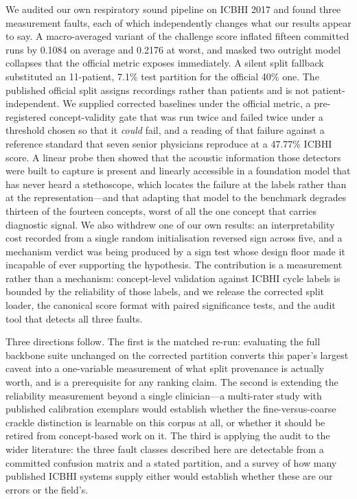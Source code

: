 \documentclass[journal,onecolumn]{IEEEtran}
\begin{document}
We audited our own respiratory sound pipeline on ICBHI 2017 and found three
measurement faults, each of which independently changes what our results appear to
say. A macro-averaged variant of the challenge score inflated fifteen committed runs
by 0.1084 on average and 0.2176 at worst, and masked two outright model collapses
that the official metric exposes immediately. A silent split fallback substituted an
11-patient, 7.1\% test partition for the official 40\% one. The published official
split assigns recordings rather than patients and is not patient-independent. We
supplied corrected baselines under the official metric, a pre-registered
concept-validity gate that was run twice and failed twice under a threshold chosen so
that it \emph{could} fail, and a reading of that failure against a reference standard
that seven senior physicians reproduce at a 47.77\% ICBHI score. A linear probe then
showed that the acoustic information those detectors were built to capture is present
and linearly accessible in a foundation model that has never heard a stethoscope, which
locates the failure at the labels rather than at the representation---and that adapting
that model to the benchmark degrades thirteen of the fourteen concepts, worst of all the
one concept that carries diagnostic signal. We also withdrew one of our own results: an
interpretability cost recorded from a single random initialisation reversed sign across
five, and a mechanism verdict was being produced by a sign test whose design floor made
it incapable of ever supporting the hypothesis. The contribution is a
measurement rather than a mechanism: concept-level validation against ICBHI cycle
labels is bounded by the reliability of those labels, and we release the corrected
split loader, the canonical score format with paired significance tests, and the audit
tool that detects all three faults.

Three directions follow. The first is the matched re-run: evaluating the full backbone
suite unchanged on the corrected partition converts this paper's largest caveat into a
one-variable measurement of what split provenance is actually worth, and is a
prerequisite for any ranking claim. The second is extending the reliability
measurement beyond a single clinician---a multi-rater study with published calibration
exemplars would establish whether the fine-versus-coarse crackle distinction is
learnable on this corpus at all, or whether it should be retired from concept-based
work on it. The third is applying the audit to the wider literature: the three fault
classes described here are detectable from a committed confusion matrix and a stated
partition, and a survey of how many published ICBHI systems supply either would
establish whether these are our errors or the field's.



\end{document}
